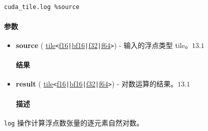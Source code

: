 \documentclass{article}
\begin{document}
\begin{lstlisting}

cuda_tile.log %source

\end{lstlisting}



\paragraph{参数}


\begin{itemize}
\item \textbf{source} ( \href{https://docs.nvidia.com/cuda/tile-ir/latest/sections/types.html#type-tile}{tile}\texttt{<}\href{https://docs.nvidia.com/cuda/tile-ir/latest/sections/types.html#subsection-element-types}{f16}\texttt{|}\href{https://docs.nvidia.com/cuda/tile-ir/latest/sections/types.html#subsection-element-types}{bf16}\texttt{|}\href{https://docs.nvidia.com/cuda/tile-ir/latest/sections/types.html#subsection-element-types}{f32}\texttt{|}\href{https://docs.nvidia.com/cuda/tile-ir/latest/sections/types.html#subsection-element-types}{f64}\texttt{>}) - 输入的浮点类型 tile。$\boxed{13.1}$




\paragraph{结果}


\item \textbf{result} ( \href{https://docs.nvidia.com/cuda/tile-ir/latest/sections/types.html#type-tile}{tile}\texttt{<}\href{https://docs.nvidia.com/cuda/tile-ir/latest/sections/types.html#subsection-element-types}{f16}\texttt{|}\href{https://docs.nvidia.com/cuda/tile-ir/latest/sections/types.html#subsection-element-types}{bf16}\texttt{|}\href{https://docs.nvidia.com/cuda/tile-ir/latest/sections/types.html#subsection-element-types}{f32}\texttt{|}\href{https://docs.nvidia.com/cuda/tile-ir/latest/sections/types.html#subsection-element-types}{f64}\texttt{>}) - 对数运算的结果。$\boxed{13.1}$




\paragraph{描述}


\end{itemize}
\texttt{log} 操作计算浮点数张量的逐元素自然对数。
\end{document}
